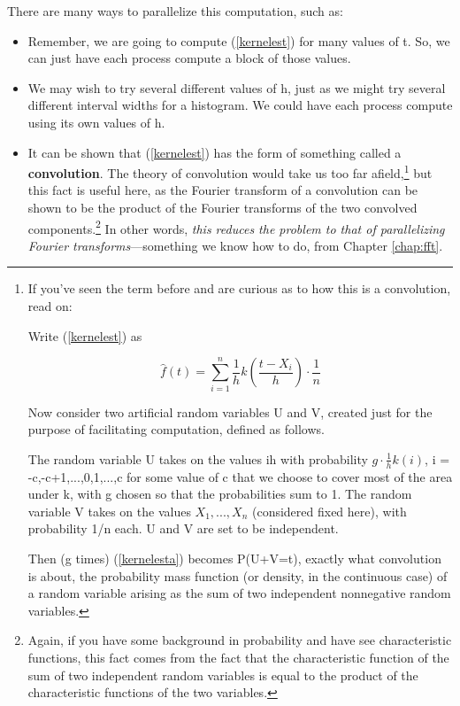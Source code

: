 
There are many ways to parallelize this computation, such as:

\begin{itemize}

\item Remember, we are going to compute (\ref{kernelest}) for many
values of t.  So, we can just have each process compute a block of those
values.

\item We may wish to try several different values of h, just as we might
try several different interval widths for a histogram.  We could have
each process compute using its own values of h.

\item It can be shown that (\ref{kernelest}) has the form of something
called a {\bf convolution}.  The theory of convolution would take us too
far afield,\footnote{

If you've seen the term before and are curious as to how this is a
convolution, read on:

Write (\ref{kernelest}) as

\begin{equation}
\label{kernelesta}
\widehat{f}(t) =
\sum_{i=1}^{n} \frac{1}{h} k \left ( \frac{t-X_i}{h} \right )
   \cdot \frac{1}{n}
\end{equation}

Now consider two artificial random variables U and V, created just for
the purpose of facilitating computation, defined as follows.

The random variable U takes on the values ih with probability $g \cdot
\frac{1}{h} k(i)$, i = -c,-c+1,...,0,1,...,c for some value of c that we
choose to cover most of the area under k, with g chosen so that the
probabilities sum to 1.  The random variable V takes on the values
$X_1,...,X_n$ (considered fixed here), with probability 1/n each.
U and V are set to be independent.

Then (g times) (\ref{kernelesta}) becomes P(U+V=t), exactly what
convolution is about, the probability mass function (or density, in the
continuous case) of a random variable arising as the sum of two
independent nonnegative random variables.} but this fact is useful
here, as the Fourier transform of a convolution can be shown to be the
product of the Fourier transforms of the two convolved
components.\footnote{Again, if you have some background in probability
and have see characteristic functions, this fact comes from the fact
that the characteristic function of the sum of two independent random
variables is equal to the product of the characteristic functions of the
two variables.} In other words, {\it this reduces the problem to that of
parallelizing Fourier transforms}---something we know how to do, from
Chapter \ref{chap:fft}.

\end{itemize}

